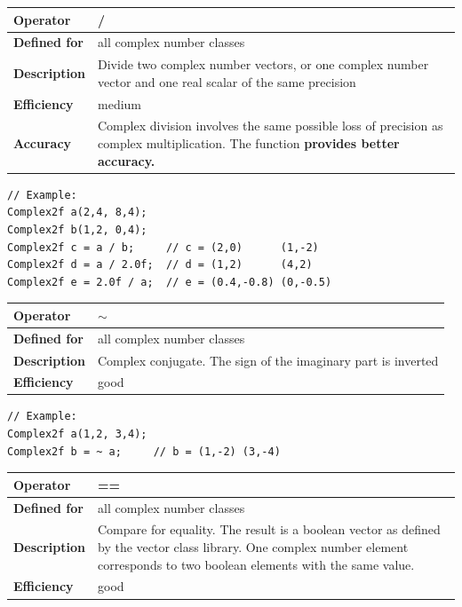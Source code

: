 \documentclass[11pt,a4paper,oneside,openright]{report}
\newcommand{\vspacesmall}{\vspace{3mm}}
\newcommand{\vspacebig}{\vspace{6mm}}
\newcommand{\codei}[1]{\bfseries \ttfamily{#1}\normalfont}
\begin{document}
\begin{tabular}{|p{25mm}|p{100mm}|}
\hline
\bfseries Operator & / \\ \hline
\bfseries Defined for & all complex number classes  \\ \hline
\bfseries Description & Divide two complex number vectors, or one complex number vector and one real scalar of the same precision \\ \hline
\bfseries Efficiency & medium \\ \hline
\bfseries Accuracy & Complex division involves the same possible  loss of precision as complex multiplication. The function \codei{div\_accurate} provides better accuracy.\\ \hline

\end{tabular}
\vspacesmall

\begin{lstlisting}[frame=none]
// Example:
Complex2f a(2,4, 8,4);
Complex2f b(1,2, 0,4);
Complex2f c = a / b;     // c = (2,0)      (1,-2)
Complex2f d = a / 2.0f;  // d = (1,2)      (4,2)
Complex2f e = 2.0f / a;  // e = (0.4,-0.8) (0,-0.5)
\end{lstlisting}
\vspacebig


\begin{tabular}{|p{25mm}|p{100mm}|}
\hline
\bfseries Operator & $\sim$ \\ \hline
\bfseries Defined for & all complex number classes  \\ \hline
\bfseries Description & Complex conjugate. The sign of the imaginary part is inverted \\ \hline
\bfseries Efficiency & good \\ \hline
\end{tabular}
\vspacesmall

\begin{lstlisting}[frame=none]
// Example:
Complex2f a(1,2, 3,4);
Complex2f b = ~ a;     // b = (1,-2) (3,-4)
\end{lstlisting}
\vspacebig


\begin{tabular}{|p{25mm}|p{100mm}|}
\hline
\bfseries Operator & == \\ \hline
\bfseries Defined for & all complex number classes  \\ \hline
\bfseries Description & Compare for equality.\newline
The result is a boolean vector as defined by the vector class library.\newline
One complex number element corresponds to two boolean elements with the same value. \\ \hline
\bfseries Efficiency & good \\ \hline
\end{tabular}
\vspacesmall
\end{document}
